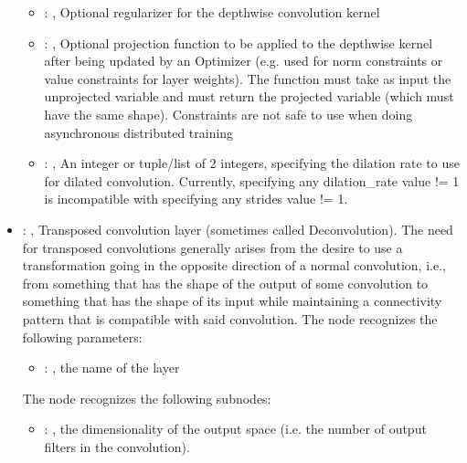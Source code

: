 \begin{itemize}
\begin{itemize}
        \item {}: , 
          Optional regularizer for the depthwise convolution kernel

        \item {}: , 
          Optional projection function to be applied to the depthwise kernel after being updated by
          an Optimizer         (e.g. used for norm constraints or value constraints for layer
          weights). The function must take as input the         unprojected variable and must return
          the projected variable (which must have the same shape).         Constraints are not safe
          to use when doing asynchronous distributed training

        \item {}: , 
          An integer or tuple/list of 2 integers, specifying the dilation rate to use for dilated
          convolution.         Currently, specifying any dilation\_rate value != 1 is incompatible
          with specifying any strides value != 1.
      \end{itemize}

    \item {}: , 
      Transposed convolution layer (sometimes called Deconvolution). The need for transposed
      convolutions         generally arises from the desire to use a transformation going in the
      opposite direction of a normal         convolution, i.e., from something that has the shape of
      the output of some convolution to something that         has the shape of its input while
      maintaining a connectivity pattern that is compatible with said convolution.
      The  node recognizes the following parameters:
        \begin{itemize}
          \item {}: , 
            the name of the layer
      \end{itemize}

      The  node recognizes the following subnodes:
      \begin{itemize}
        \item {}: , 
          the dimensionality of the output space (i.e. the number of output filters in the
          convolution).


\end{itemize}
\end{itemize}

